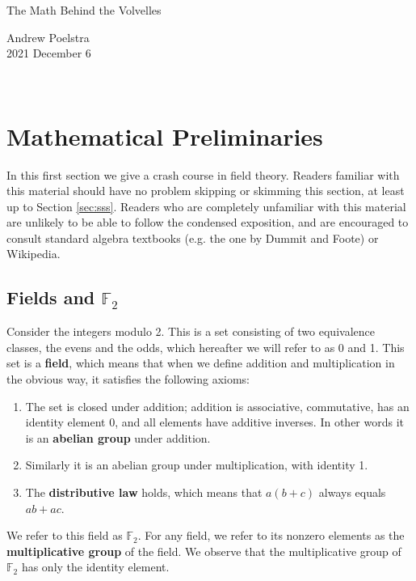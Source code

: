 \documentclass[letterpaper]{article}
\theoremstyle{xxx}
\theoremstyle{evil}
\theoremstyle{yyy}
\theoremstyle{plain}
\theoremstyle{zzz}
\newcommand{\ftwo}{\mathbb{F}_2}
\begin{document}
\begin{minipage}[b]{0.7\linewidth}
{\huge The Math Behind the Volvelles}
\end{minipage}
\begin{minipage}[b]{0.3\linewidth}
  \begin{flushright}
    Andrew Poelstra\\
    2021 December 6
  \end{flushright}
\end{minipage}
\\

\section{Mathematical Preliminaries}

In this first section we give a crash course in field theory. Readers familiar
with this material should have no problem skipping or skimming this section,
at least up to Section \ref{sec:sss}.
Readers who are completely unfamiliar with this material are unlikely to be
able to follow the condensed exposition, and are encouraged to consult
standard algebra textbooks (e.g. the one by Dummit and Foote) or Wikipedia.

\subsection{Fields and $\ftwo$}
Consider the integers modulo 2. This is a set consisting of two equivalence
classes, the evens and the odds, which hereafter we will refer to as 0 and 1.
This set is a \textbf{field}, which means that when we define addition and
multiplication in the obvious way, it satisfies the following axioms:
\begin{enumerate}
\item The set is closed under addition; addition is associative, commutative,
has an identity element 0, and all elements have additive inverses. In other
words it is an \textbf{abelian group} under addition.
\item Similarly it is an abelian group under multiplication, with identity 1.
\item The \textbf{distributive law} holds, which means that $a(b + c)$ always
equals $ab + ac$.
\end{enumerate}

We refer to this field as $\ftwo$. For any field, we refer to its nonzero
elements as the \textbf{multiplicative group} of the field. We observe that
the multiplicative group of $\ftwo$ has only the identity element.
\end{document}
